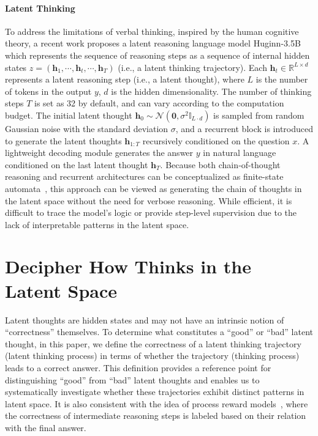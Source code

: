\documentclass{article} %
\begin{document}
\paragraph*{Latent Thinking}
\vspace{-0.1cm}
To address the limitations of verbal thinking, inspired by the human cognitive theory, a recent work proposes a latent reasoning language model Huginn-3.5B~\citep{geiping2025scaling} which represents the sequence of reasoning steps as a sequence of internal hidden states $z=(\mathbf{h}_1,\cdots, \mathbf{h}_t, \cdots, \mathbf{h}_T)$ (i.e., a latent thinking trajectory). Each $\mathbf{h}_t\in\mathbb{R}^{L\times d}$ represents a latent reasoning step (i.e., a latent thought), where $L$ is the number of tokens in the output $y$, $d$ is the hidden dimensionality.
%
The number of thinking steps $T$ is set as 32 by default, and can vary according to the computation budget.
%
The initial latent thought $\mathbf{h}_0\sim\mathcal{N}(\mathbf{0},\sigma^2\mathbb{I}_{L\cdot d})$ is sampled from random Gaussian noise with the standard deviation $\sigma$, and a recurrent block is introduced to generate the latent thoughts $\mathbf{h}_{1:T}$ recursively conditioned on the question $x$. A lightweight decoding module generates the answer $y$ in natural language conditioned on the last latent thought $\mathbf{h}_T$.
%
%
Because both chain‑of-thought reasoning and recurrent architectures can be conceptualized as finite-state automata~\citep{svete2023recurrent,zhang2024autoregressive}, this approach can be viewed as generating the chain of thoughts in the latent space without the need for verbose reasoning. 
%
While efficient, it is difficult to trace the model’s logic or provide step-level supervision due to the lack of interpretable patterns in the latent space.
\section{Decipher How \LRLM Thinks in the Latent Space}
\label{sec:understand}
Latent thoughts are hidden states and may not have an intrinsic notion of ``correctness'' themselves. To determine what constitutes a ``good'' or ``bad'' latent thought, in this paper, we define the correctness of a latent thinking trajectory (latent thinking process) in terms of whether the trajectory (thinking process) leads to a correct answer. This definition provides a reference point for distinguishing ``good'' from ``bad'' latent thoughts and enables us to systematically investigate whether these trajectories exhibit distinct patterns in latent space.
%
It is also consistent with the idea of process reward models~\citep{wang-etal-2024-math,lu2024autopsv}, where the correctness of intermediate reasoning steps is labeled based on their relation with the final answer.
\end{document}
